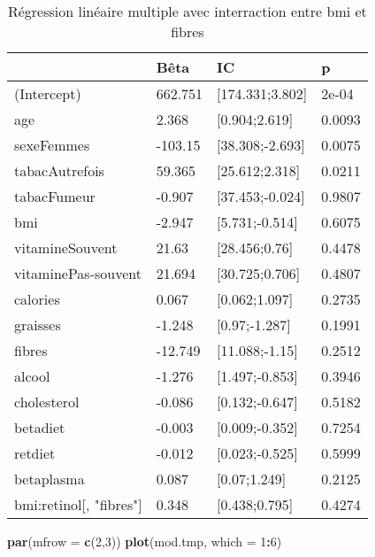 \documentclass[]{article}
\newenvironment{Shaded}{\begin{snugshade}}{\end{snugshade}}
\newcommand{\KeywordTok}[1]{\textcolor[rgb]{0.13,0.29,0.53}{\textbf{#1}}}
\newcommand{\DataTypeTok}[1]{\textcolor[rgb]{0.13,0.29,0.53}{#1}}
\newcommand{\DecValTok}[1]{\textcolor[rgb]{0.00,0.00,0.81}{#1}}
\newcommand{\OperatorTok}[1]{\textcolor[rgb]{0.81,0.36,0.00}{\textbf{#1}}}
\newcommand{\NormalTok}[1]{#1}
\begin{document}
\begin{table}

\caption{\label{tab:unnamed-chunk-72}Régression linéaire multiple avec interraction entre bmi et fibres}
\centering
\begin{tabular}[t]{l|l|l|l}
\hline
  & Bêta & IC & p\\
\hline
\rowcolor[HTML]{BBD2E1}  (Intercept) & 662.751 & [174.331;3.802] & 2e-04\\
\hline
age & 2.368 & [0.904;2.619] & 0.0093\\
\hline
\rowcolor[HTML]{BBD2E1}  sexeFemmes & -103.15 & [38.308;-2.693] & 0.0075\\
\hline
tabacAutrefois & 59.365 & [25.612;2.318] & 0.0211\\
\hline
\rowcolor[HTML]{BBD2E1}  tabacFumeur & -0.907 & [37.453;-0.024] & 0.9807\\
\hline
bmi & -2.947 & [5.731;-0.514] & 0.6075\\
\hline
\rowcolor[HTML]{BBD2E1}  vitamineSouvent & 21.63 & [28.456;0.76] & 0.4478\\
\hline
vitaminePas-souvent & 21.694 & [30.725;0.706] & 0.4807\\
\hline
\rowcolor[HTML]{BBD2E1}  calories & 0.067 & [0.062;1.097] & 0.2735\\
\hline
graisses & -1.248 & [0.97;-1.287] & 0.1991\\
\hline
\rowcolor[HTML]{BBD2E1}  fibres & -12.749 & [11.088;-1.15] & 0.2512\\
\hline
alcool & -1.276 & [1.497;-0.853] & 0.3946\\
\hline
\rowcolor[HTML]{BBD2E1}  cholesterol & -0.086 & [0.132;-0.647] & 0.5182\\
\hline
betadiet & -0.003 & [0.009;-0.352] & 0.7254\\
\hline
\rowcolor[HTML]{BBD2E1}  retdiet & -0.012 & [0.023;-0.525] & 0.5999\\
\hline
betaplasma & 0.087 & [0.07;1.249] & 0.2125\\
\hline
\rowcolor[HTML]{BBD2E1}  bmi:retinol[, "fibres"] & 0.348 & [0.438;0.795] & 0.4274\\
\hline
\end{tabular}
\end{table}

\begin{Shaded}
\begin{Highlighting}[]
\KeywordTok{par}\NormalTok{(}\DataTypeTok{mfrow =} \KeywordTok{c}\NormalTok{(}\DecValTok{2}\NormalTok{,}\DecValTok{3}\NormalTok{))}
\KeywordTok{plot}\NormalTok{(mod.tmp, }\DataTypeTok{which =} \DecValTok{1}\OperatorTok{:}\DecValTok{6}\NormalTok{)}
\end{Highlighting}
\end{Shaded}
\end{document}

